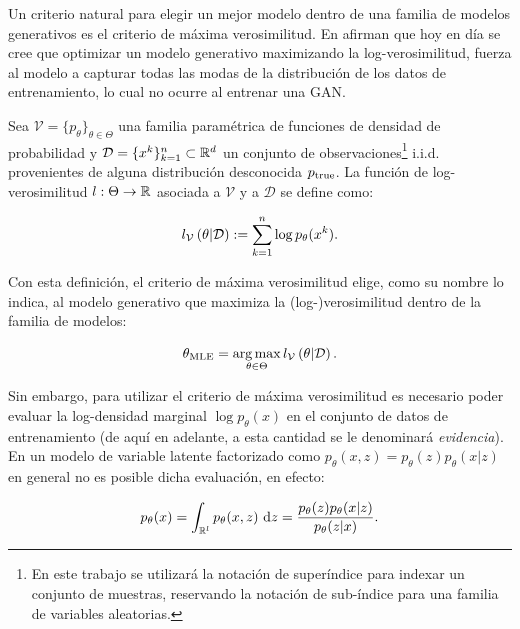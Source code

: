 Un criterio natural para elegir un mejor modelo dentro de una familia de modelos generativos es el criterio de máxima verosimilitud. En \cite{nichol2021improved} afirman que hoy en día se cree que optimizar un modelo generativo maximizando la log-verosimilitud, fuerza al modelo a capturar todas las modas de la distribución de los datos de entrenamiento, lo cual no ocurre al entrenar una GAN.

\begin{defn}
    Sea $\mathcal{V}=\{p_\theta\}_{\theta\in\Theta}$ una familia paramétrica de funciones de densidad de probabilidad y $\mathcal{D} = \{x^k\}_{k=1}^n\subset\mathbb{R}^d$ un conjunto de observaciones\footnote{En este trabajo se utilizará la notación de superíndice para indexar un conjunto de muestras, reservando la notación de sub-índice para una familia de variables aleatorias.} i.i.d. provenientes de alguna distribución desconocida $p_{\operatorname{true}}$. La función de log-verosimilitud $l:\Theta\to\mathbb{R}$ asociada a $\mathcal{V}$ y a $\mathcal{D}$ se define como:

    \begin{equation*}
        l_\mathcal{V}\left(\theta|\mathcal{D}\right)
        := \sum_{k=1}^n \log p_\theta(x^k).
    \end{equation*}
\end{defn}

Con esta definición, el criterio de máxima verosimilitud elige, como su nombre lo indica, al modelo generativo que maximiza la (log-)verosimilitud dentro de la familia de modelos:

\begin{equation*}
    \theta_{\text{MLE}}
    =\operatorname*{arg\,max}_{\theta\in\Theta} l_\mathcal{V}\left(\theta|\mathcal{D}\right).
\end{equation*}

Sin embargo, para utilizar el criterio de máxima verosimilitud es necesario poder evaluar la log-densidad marginal $\log p_\theta(x)$ en el conjunto de datos de entrenamiento (de aquí en adelante, a esta cantidad se le denominará \textit{evidencia}). En un modelo de variable latente factorizado como $p_\theta(x,z)=p_\theta(z)p_\theta(x|z)$ en general no es posible dicha evaluación, en efecto:

\begin{equation}
    \label{eq:generative_marginal}
    p_\theta(x)
    = \int_{\mathbb{R}^l} p_\theta(x,z) \,\operatorname{d}\! z
    = \frac{p_\theta(z)p_\theta(x|z)}{p_\theta(z|x)}.
\end{equation}

